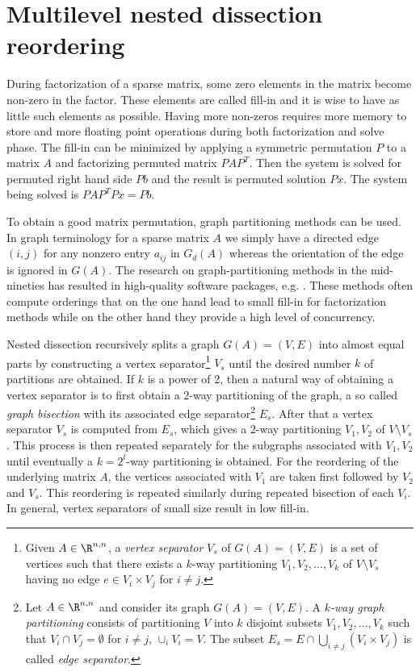 \section{Multilevel nested dissection reordering}

During factorization of a sparse matrix, some zero elements in the matrix become non-zero in the factor. These elements are called fill-in and it is wise to have as little such elements as possible. Having more non-zeros requires more memory to store and more floating point operations during both factorization and solve phase.
The fill-in can be minimized by applying a symmetric permutation $P$ to a matrix $A$ and factorizing permuted matrix $PAP^T$. Then the system is solved for permuted right hand side $Pb$ and the result is permuted solution $Px$. The system being solved is $PAP^TPx = Pb$.

To obtain a good matrix permutation, graph partitioning methods can be used. 
In graph terminology for a sparse matrix $A$ we simply have a directed
edge $(i,j)$ for any nonzero entry $a_{ij}$ in $G_d(A)$ whereas the 
orientation of the edge is ignored in $G(A)$.
The research on graph-partitioning
methods in the mid-nineties has resulted in high-quality software
packages, e.g. \metis {} \cite{karypis:98}.
These methods often compute orderings that on the one hand lead to small fill-in 
for factorization methods while on the other hand they
provide a high level of concurrency.

Nested dissection recursively splits a graph $G(A)= (V,E)$ into almost
equal parts by constructing a vertex separator\footnote{
Given $A\in\R^{n,n}$,
    a \emph{vertex separator} $V_s$ of $G(A)= (V,E)$ is a
    set of vertices such that there exists a $k$-way partitioning 
    $V_1, V_2, \ldots, V_k$ of $V \setminus V_s$ having no edge
    $e\in V_i\times V_j$ for $i\ne j$. 
}
$V_s$ 
until the desired number $k$ 
of partitions are obtained. If $k$ is a power of $2$, then a natural
way of obtaining a vertex separator
is to first obtain a $2$-way partitioning of the graph, a so called
\emph{graph bisection} with its associated edge separator\footnote{
Let $A\in\R^{n,n}$
and consider its graph $G(A)=(V,E)$. 
A \emph{$k$-way graph partitioning} consists of 
partitioning $V$ into $k$ disjoint subsets
$V_1, V_2, \ldots, V_k$ such that $V_i \cap V_j = \emptyset$ for $i
\ne j$,  $\cup_i V_i=V$.
The subset $E_s = E\cap \bigcup_{i\not=j} (V_i\times V_j)$ is called 
\emph{edge separator}.
}
$E_s$.
After that a vertex separator $V_s$ is computed from $E_s$, which
gives a $2$-way partitioning $V_1,V_2$ of $V\setminus V_s$.
This process is then repeated separately
for the subgraphs associated with $V_1,V_2$ until eventually a
$k=2^l$-way partitioning is obtained. For the reordering of the
underlying matrix $A$, the vertices associated with $V_1$ are taken first
followed by $V_2$ and $V_s$. This reordering is repeated similarly during
repeated bisection of each $V_i$. In general, vertex separators
of small size result in low fill-in.




